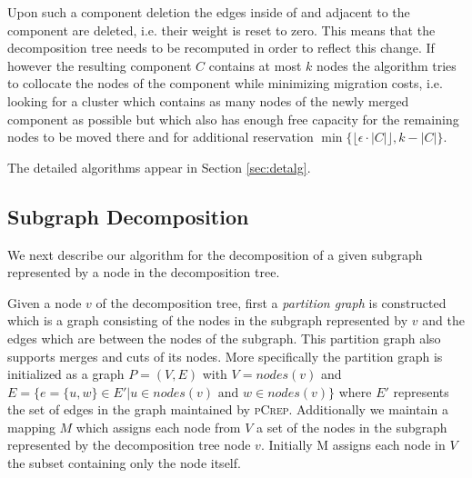 \documentclass[a4paper,UKenglish,cleveref, autoref, thm-restate,authorcolumns]{../lipics/lipics-v2019}
\newcommand{\adjDel}{\textsc{pCrep}}
\begin{document}
Upon such a component deletion the edges inside of and adjacent to the component are deleted, i.e. their weight is reset to zero. This means that the decomposition tree needs to be recomputed in order to reflect this change.
If however the resulting component $C$ contains at most $k$ nodes the algorithm tries to collocate the nodes of the component while minimizing migration costs, i.e. looking for a cluster which contains as many nodes of the newly merged component as possible but which also has enough free capacity for the remaining nodes to be moved there and for additional reservation $\min\{\lfloor\epsilon\cdot|C|\rfloor,k-|C|\}$.


The detailed algorithms appear in Section
\ref{sec:detalg}.

\subsection{Subgraph Decomposition}
\label{decomp_desc}

We next describe our algorithm for the decomposition of a given subgraph represented by a node in the decomposition tree. 

Given a node $v$ of the decomposition tree, first a \textit{partition graph} is constructed which is a graph consisting of the nodes in the subgraph represented by $v$ and the edges which are between the nodes of the subgraph. This partition graph also supports merges and cuts of its nodes. More specifically the partition graph is initialized as a graph $P=(V,E)$ with $V=nodes(v)$ and $E=\{e=\{u,w\}\in E'|u\in nodes(v)\text{ and }w\in nodes(v)\}$ where $E'$ represents the set of edges in the graph maintained by \adjDel{}. Additionally we maintain a mapping $M$ which assigns each node from $V$ a set of the nodes in the subgraph represented by the decomposition tree node $v$. Initially M assigns each node in $V$ the subset containing only the node itself.
\end{document}
